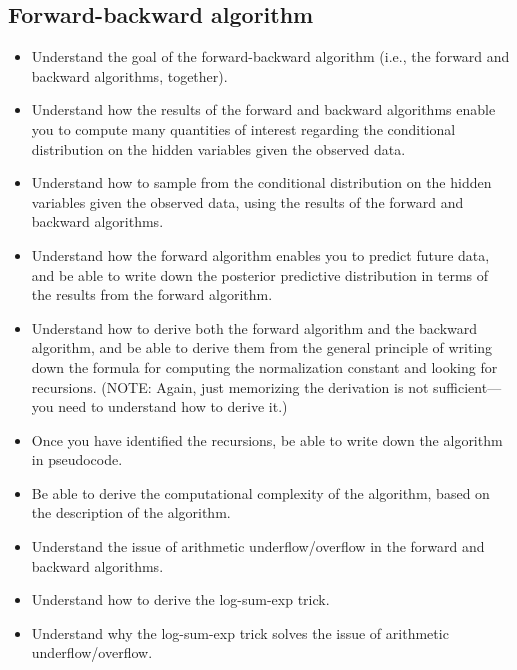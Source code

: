 \documentclass[12pt]{article}
\begin{document}
\subsection{Forward-backward algorithm}
\begin{itemize}
\item Understand the goal of the forward-backward algorithm (i.e., the forward and backward algorithms, together).
\item Understand how the results of the forward and backward algorithms enable you to compute many quantities of interest regarding the conditional distribution on the hidden variables given the observed data.
\item Understand how to sample from the conditional distribution on the hidden variables given the observed data, using the results of the forward and backward algorithms.
\item Understand how the forward algorithm enables you to predict future data, and be able to write down the posterior predictive distribution in terms of the results from the forward algorithm.
\item Understand how to derive both the forward algorithm and the backward algorithm, and be able to derive them from the general principle of writing down the formula for computing the normalization constant and looking for recursions. (NOTE: Again, just memorizing the derivation is not sufficient---you need to understand how to derive it.)
\item Once you have identified the recursions, be able to write down the algorithm in pseudocode.
\item Be able to derive the computational complexity of the algorithm, based on the description of the algorithm.
\item Understand the issue of arithmetic underflow/overflow in the forward and backward algorithms.
\item Understand how to derive the log-sum-exp trick.
\item Understand why the log-sum-exp trick solves the issue of arithmetic underflow/overflow.
\end{itemize}

  
\end{document}
